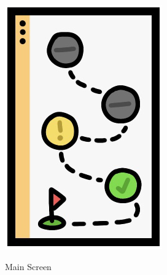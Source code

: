\begin{figure}[!htbp]
    	\hspace{1em}
    	\begin{subfigure}[b]{0.2\linewidth}
    		\includegraphics[width=\textwidth]{MainScreen.png}\\
    		\caption{Main Screen}
    	\end{subfigure}
    	\hspace{1em}
    	\begin{subfigure}[b]{0.203\linewidth}

\end{subfigure}
\end{figure}
